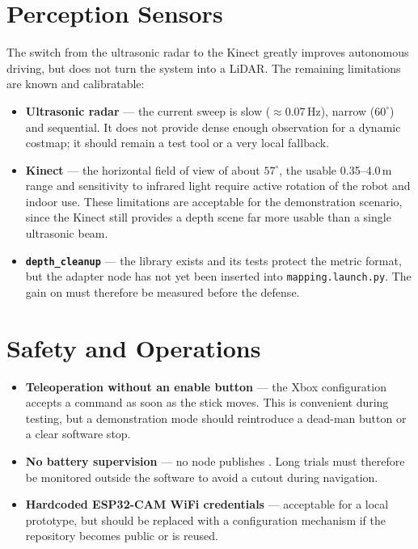 \section{Perception Sensors}
\label{sec:lim_sensors}

The switch from the ultrasonic radar to the Kinect greatly improves autonomous driving,
but does not turn the system into a LiDAR. The remaining limitations are known and
calibratable:

\begin{itemize}
	\item \textbf{Ultrasonic radar} --- the current sweep is slow ($\approx$0.07\,Hz),
	      narrow ($60^\circ$) and sequential. It does not provide dense enough
	      observation for a dynamic costmap; it should remain a test tool or a very
	      local fallback.
	\item \textbf{Kinect} --- the horizontal field of view of about $57^\circ$, the
	      usable 0.35--4.0\,m range and sensitivity to infrared light require active
	      rotation of the robot and indoor use. These limitations are acceptable for the
	      demonstration scenario, since the Kinect still provides a depth scene far more
	      usable than a single ultrasonic beam.
	\item \textbf{\texttt{depth\_cleanup}} --- the library exists and its tests protect
	      the metric format, but the adapter \ros{} node has not yet been inserted into
	      \texttt{mapping.launch.py}. The gain on  must therefore be
	      measured before the defense.
\end{itemize}

\section{Safety and Operations}
\label{sec:lim_safety}

\begin{itemize}
	\item \textbf{Teleoperation without an enable button} --- the Xbox configuration
	      accepts a command as soon as the stick moves. This is convenient during
	      testing, but a demonstration mode should reintroduce a dead-man button or a
	      clear software stop.
	\item \textbf{No battery supervision} --- no node publishes
	      . Long trials must therefore be monitored outside the
	      software to avoid a cutout during navigation.
	\item \textbf{Hardcoded ESP32-CAM WiFi credentials} --- acceptable for a local
	      prototype, but should be replaced with a configuration mechanism if the
	      repository becomes public or is reused.
\end{itemize}

